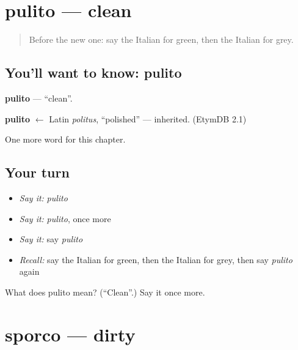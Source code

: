 \section[pulito]{pulito — clean}

\label{lesson:IT-C77-pulito}



\begin{quote}
Before the new one: say the Italian for green, then the Italian for grey.
\end{quote}

\subsection*{You'll want to know: pulito}
\textbf{pulito} — \textquotedblleft{}clean\textquotedblright{}.

\begin{cousinweb}
\textbf{pulito} $\leftarrow$ Latin \emph{politus}, \textquotedblleft{}polished\textquotedblright{} — inherited. (EtymDB 2.1)
\end{cousinweb}

\begin{grammarlens}[title={What you've built}]
One more word for this chapter.
\end{grammarlens}

\subsection*{Your turn}
\begin{itemize}
\raggedright
  \item \emph{Say it:} \emph{pulito}
  \item \emph{Say it:} \emph{pulito}, once more
  \item \emph{Say it:} say \emph{pulito}
  \item \emph{Recall:} say the Italian for green, then the Italian for grey, then say \emph{pulito} again
\end{itemize}

\begin{tcolorbox}[breakable,colback=teal!4,colframe=teal!35!black,title={Before you move on}]
What does pulito mean? (\textquotedblleft{}Clean\textquotedblright{}.) Say it once more.
\end{tcolorbox}
\section[sporco]{sporco — dirty}

